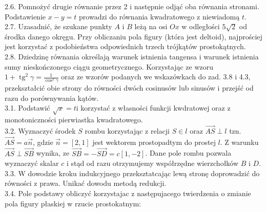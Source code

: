 \documentclass[10pt]{article}
\begin{document}
2.6. Pomnożyć drugie równanie przez 2 i następnie odjąć oba równania stronami. Podstawienie $x-y=t$ prowadzi do równania kwadratowego z niewiadomą $t$.\\
2.7. Uzasadnić, że szukane punkty $A$ i $B$ leżą na osi $O x$ w odległości $5 \sqrt{2}$ od środka danego okręgu. Przy obliczaniu pola figury (która jest deltoid), najprościej jest korzystać z podobieństwa odpowiednich trzech trójkątów prostokątnych.\\
2.8. Dziedzinę równania określają warunek istnienia tangensa i warunek istnienia sumy nieskończonego ciągu geometrycznego. Korzystając ze wzoru $1+\operatorname{tg}^{2} \gamma=\frac{1}{\cos ^{2} \gamma}$ oraz ze wzorów podanych we wskazówkach do zad. 3.8 i 4.3, przekształcić obie strony do równości dwóch cosinusów lub sinusów i przejść od razu do porównywania kątów.\\
3.1. Podstawić $\sqrt{x}=t \mathrm{i}$ korzystać z własności funkcji kwdratowej oraz z monotoniczności pierwiastka kwadratowego.\\
3.2. Wyznaczyć środek $S$ rombu korzystając z relacji $S \in l$ oraz $\overrightarrow{A S} \perp l$ tzn. $\overrightarrow{A S}=a \vec{n}$, gdzie $\vec{n}=[2,1]$ jest wektorem prostopadtym do prostej $l$. Z warunku $\overrightarrow{A S} \perp \overrightarrow{S B}$ wynika, ze $\overrightarrow{S B}=-\overrightarrow{S D}=c[1,-2]$. Dane pole rombu pozwala wyznaczyć skalar $c$ i stąd od razu otrzymujemy współrzędne wierzchołków $B$ i $D$.\\
3.3. W dowodzie kroku indukcyjnego przeksztatcając lewą stronę doprowadzić do równości z prawa. Unikać dowodu metodą redukcji.\\
3.4. Pole podstawy obliczyć korzystajac z następujacego twierdzenia o zmianie pola figury płaskiej w rzucie prostokatnym:
\end{document}
